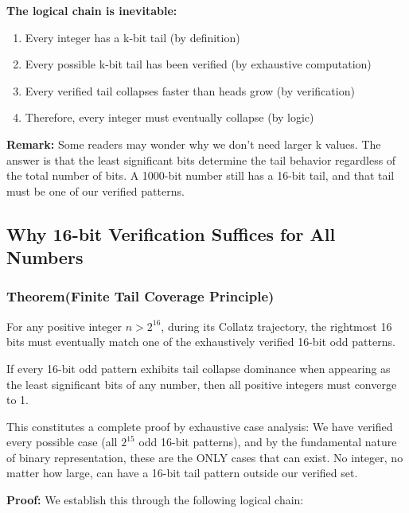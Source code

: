 \documentclass[10pt,letterpaper]{article}
\begin{document}
\textbf{The logical chain is inevitable:}

\begin{enumerate}
    \item Every integer has a k-bit tail (by definition)
    \item Every possible k-bit tail has been verified (by exhaustive computation)
    \item Every verified tail collapses faster than heads grow (by verification)
    \item Therefore, every integer must eventually collapse (by logic)
\end{enumerate}

\textbf{Remark: } Some readers may wonder why we don't need larger k values. The answer is that the least significant bits determine the tail behavior regardless of the total number of bits. A 1000-bit number still has a 16-bit tail, and that tail must be one of our verified patterns.

\subsection{Why 16-bit Verification Suffices for All Numbers}

\subsubsection{Theorem(Finite Tail Coverage Principle)}

For any positive integer $n > 2^{16}$, during its Collatz trajectory, the rightmost 16 bits must eventually match one of the exhaustively verified 16-bit odd patterns.

If every 16-bit odd pattern exhibits tail collapse dominance when appearing as the least significant bits of any number, then all positive integers must converge to 1.

This constitutes a complete proof by exhaustive case analysis: We have verified every possible case (all $2^{15}$ odd 16-bit patterns), and by the fundamental nature of binary representation, these are the ONLY cases that can exist. No integer, no matter how large, can have a 16-bit tail pattern outside our verified set.

\vspace{1em}

\textbf{Proof:} We establish this through the following logical chain:
\end{document}
